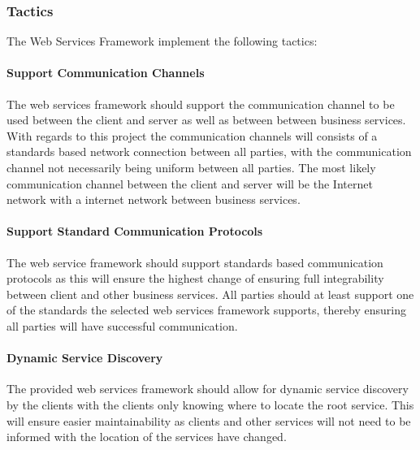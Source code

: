 \subsubsection{Tactics}
The Web Services Framework implement the following tactics:
\paragraph{Support Communication Channels}
The web services framework should support the communication channel to be used
between the client and server as well as between between business services.
With regards to this project the communication channels will consists of a
standards based network connection between all parties, with the communication
channel not necessarily being uniform between all parties. The most likely
communication channel between the client and server will be the Internet
network with a internet network between business services.

\paragraph{Support Standard Communication Protocols}
The web service framework should support standards based communication
protocols as this will ensure the highest change of ensuring full
integrability between client and other business services. All parties should
at least support one of the standards the selected web services framework
supports, thereby ensuring all parties will have successful communication.

\paragraph{Dynamic Service Discovery}
The provided web services framework should allow for dynamic service discovery
by the clients with the clients only knowing where to locate the root service.
This will ensure easier maintainability as clients and other services will not
need to be informed with the location of the services have changed.


